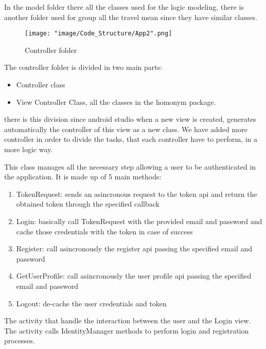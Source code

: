 In the model folder there all the classes used for the logic modeling, there is another folder used for group all the travel mean since they have similar classes.

\begin{figure}[H]
\begin{center}
\texttt{[image: "image/Code\_Structure/App2".png]}
\caption{Controller folder}
\end{center}
\end{figure}

The controller folder is divided in two main parts:
\begin{itemize}
\item Controller class
\item View Controller Class, all the classes in the homonym package.
\end{itemize}

there is this division since android studio when a new view is created, generates automatically the controller of this view as a new class. We have added more controller in order to divide the tasks, that each controller have to perform, in a more logic way.

This class manages all the necessary step allowing a user to be authenticated in the application. It is made up of 5 main methods:

\begin{enumerate}
\item TokenRequest: sends an asincronous request to the token api and return the obtained token through the specified callback
\item Login: basically call TokenRequest with the provided email and password and cache those credentials with the token in case of success
\item Register: call asincronously the register api passing the specified email and password
\item GetUserProfile: call asincronously the user profile api passing the specified email and password
\item Logout: de-cache the user credentials and token
\end{enumerate}


The activity that handle the interaction between the user and the Login view. The activity calls IdentityManager methods to perform login and registration processes.

